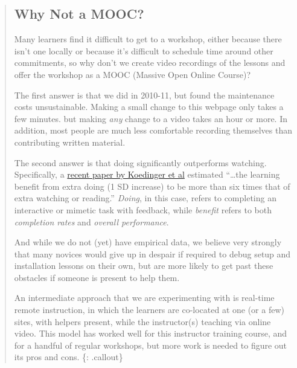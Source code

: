\begin{quote}
\subsection{Why Not a MOOC?}\label{why-not-a-mooc}

Many learners find it difficult to get to a workshop, either because
there isn't one locally or because it's difficult to schedule time
around other commitments, so why don't we create video recordings of the
lessons and offer the workshop as a MOOC (Massive Open Online Course)?

The first answer is that we did in 2010-11, but found the maintenance
costs unsustainable. Making a small change to this webpage only takes a
few minutes. but making \emph{any} change to a video takes an hour or
more. In addition, most people are much less comfortable recording
themselves than contributing written material.

The second answer is that doing significantly outperforms watching.
Specifically, a
\href{\{\{\%20site.github.url\%20\}\}/files/papers/koedinger-doing-watching-2015.pdf}{recent
paper by Koedinger et al} estimated ``\ldots{}the learning benefit from
extra doing (1 SD increase) to be more than six times that of extra
watching or reading.'' \emph{Doing}, in this case, refers to completing
an interactive or mimetic task with feedback, while \emph{benefit}
refers to both \emph{completion rates} and \emph{overall performance}.

And while we do not (yet) have empirical data, we believe very strongly
that many novices would give up in despair if required to debug setup
and installation lessons on their own, but are more likely to get past
these obstacles if someone is present to help them.

An intermediate approach that we are experimenting with is real-time
remote instruction, in which the learners are co-located at one (or a
few) sites, with helpers present, while the instructor(s) teaching via
online video. This model has worked well for this instructor training
course, and for a handful of regular workshops, but more work is needed
to figure out its pros and cons. \{: .callout\}
\end{quote}

